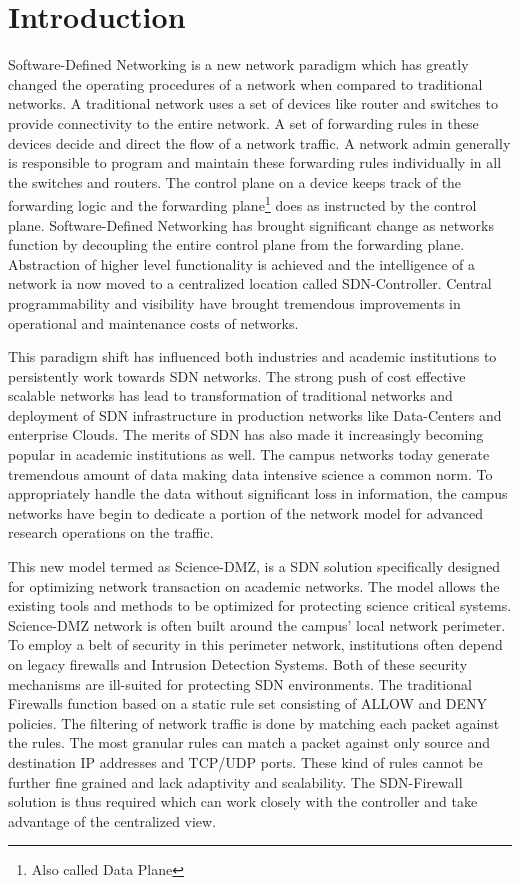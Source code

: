 \section{Introduction}

Software-Defined Networking is a new network paradigm which has greatly
changed the operating procedures of a network when compared to traditional
networks. A traditional network uses a set of devices like router and 
switches to provide connectivity to the entire network. A set of forwarding rules
in these devices decide and direct the flow of a network traffic. A network 
admin generally is responsible to program and maintain these forwarding 
rules individually in all the switches and routers. The control plane on a device
keeps track of the forwarding logic and the forwarding plane\footnote
{Also called Data Plane} does as instructed by the control plane. 
Software-Defined Networking has brought significant change as networks function by
decoupling the entire control plane from the forwarding plane. Abstraction of higher level functionality is achieved and the intelligence of a 
network  ia now moved to a centralized location called SDN-Controller. 
Central programmability and visibility have brought tremendous
improvements in operational and maintenance costs of networks.

This paradigm shift has influenced both industries and academic institutions to 
persistently work towards SDN networks. The strong push of cost effective scalable 
networks has lead to transformation of traditional networks and
deployment of SDN infrastructure in production networks like Data-Centers and enterprise Clouds. The merits of SDN has also made it increasingly becoming popular in academic institutions as well.
The campus networks today generate tremendous amount of data making data intensive science a common norm.
To appropriately handle the data without significant loss in information, the campus networks have begin to 
dedicate a portion of the network model for advanced research operations on the traffic.

This new model termed as Science-DMZ, is a SDN solution specifically designed for optimizing network transaction 
on academic networks. The model allows the existing tools and methods to be optimized for protecting science critical systems.
Science-DMZ network is often built around the campus' local network perimeter. To employ a belt of security in this perimeter network,
institutions often depend on legacy firewalls and Intrusion Detection Systems. Both of these security mechanisms are ill-suited 
for protecting SDN environments. The traditional Firewalls function based on a static rule set consisting of ALLOW and DENY policies. The filtering
of network traffic is done by matching each packet against the rules. The most granular rules can match a packet against only source and destination IP addresses and TCP/UDP ports. These kind of rules cannot be further fine grained and lack adaptivity and scalability. The SDN-Firewall solution is thus required which can work closely with the controller and take advantage of the centralized view.

